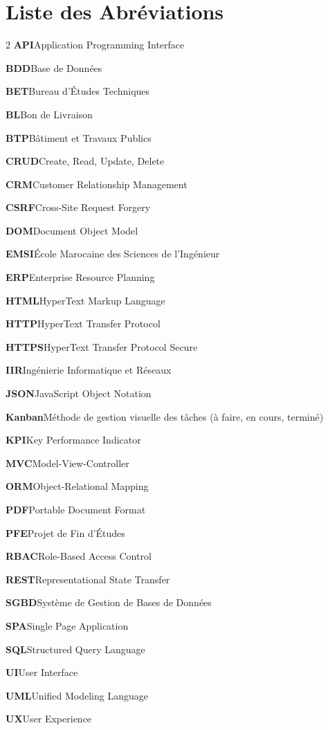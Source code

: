 
\chapter*{Liste des Abréviations}
\pagestyle{plain}

\newcommand{\acroentry}[2]{%
  \noindent\textbf{#1}\quad #2\par\vspace{5pt}%
}

\begin{multicols}{2}
\acroentry{API}{Application Programming Interface}
\acroentry{BDD}{Base de Données}
\acroentry{BET}{Bureau d'Études Techniques}
\acroentry{BL}{Bon de Livraison}
\acroentry{BTP}{Bâtiment et Travaux Publics}
\acroentry{CRUD}{Create, Read, Update, Delete}
\acroentry{CRM}{Customer Relationship Management}
\acroentry{CSRF}{Cross-Site Request Forgery}
\acroentry{DOM}{Document Object Model}
\acroentry{EMSI}{École Marocaine des Sciences de l'Ingénieur}
\acroentry{ERP}{Enterprise Resource Planning}
\acroentry{HTML}{HyperText Markup Language}
\acroentry{HTTP}{HyperText Transfer Protocol}
\acroentry{HTTPS}{HyperText Transfer Protocol Secure}
\acroentry{IIR}{Ingénierie Informatique et Réseaux}
\acroentry{JSON}{JavaScript Object Notation}
\acroentry{Kanban}{Méthode de gestion visuelle des tâches (à faire, en cours, terminé)}
\acroentry{KPI}{Key Performance Indicator}
\acroentry{MVC}{Model-View-Controller}
\acroentry{ORM}{Object-Relational Mapping}
\acroentry{PDF}{Portable Document Format}
\acroentry{PFE}{Projet de Fin d'Études}
\acroentry{RBAC}{Role-Based Access Control}
\acroentry{REST}{Representational State Transfer}
\acroentry{SGBD}{Système de Gestion de Bases de Données}
\acroentry{SPA}{Single Page Application}
\acroentry{SQL}{Structured Query Language}
\acroentry{UI}{User Interface}
\acroentry{UML}{Unified Modeling Language}
\acroentry{UX}{User Experience}
\end{multicols}

\pagestyle{fancy}
\newpage
